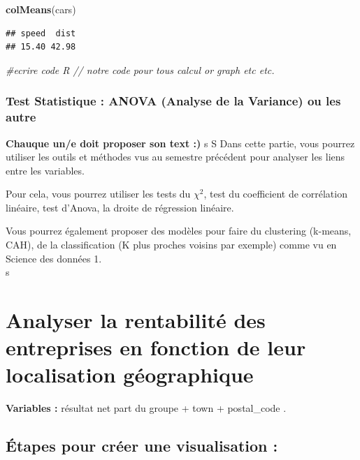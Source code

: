 \documentclass[mstat,12pt]{unswthesis}
\newenvironment{Shaded}{\begin{snugshade}}{\end{snugshade}}
\newcommand{\CommentTok}[1]{\textcolor[rgb]{0.56,0.35,0.01}{\textit{#1}}}
\newcommand{\FunctionTok}[1]{\textcolor[rgb]{0.13,0.29,0.53}{\textbf{#1}}}
\newcommand{\NormalTok}[1]{#1}
\begin{document}
\begin{Shaded}
\begin{Highlighting}[]
\FunctionTok{colMeans}\NormalTok{(cars)}
\end{Highlighting}
\end{Shaded}

\begin{verbatim}
## speed  dist 
## 15.40 42.98
\end{verbatim}

\begin{Shaded}
\begin{Highlighting}[]
 \CommentTok{\#ecrire code R // notre code pour tous calcul or graph etc etc. }
\end{Highlighting}
\end{Shaded}

\subsubsection{Test Statistique : ANOVA (Analyse de la Variance) ou les
autre}\label{test-statistique-anova-analyse-de-la-variance-ou-les-autre-1}

\textbf{Chauque un/e doit proposer son text :) }s S Dans cette partie,
vous pourrez utiliser les outils et méthodes vus au semestre précédent
pour analyser les liens entre les variables.

Pour cela, vous pourrez utiliser les tests du \(\chi^2\), test du
coefficient de corrélation linéaire, test d'Anova, la droite de
régression linéaire.

Vous pourrez également proposer des modèles pour faire du clustering
(k-means, CAH), de la classification (K plus proches voisins par
exemple) comme vu en Science des données 1.\\
s \newpage

\section{\texorpdfstring{\textbf{Analyser la rentabilité des entreprises
en fonction de leur localisation
géographique}}{Analyser la rentabilité des entreprises en fonction de leur localisation géographique}}\label{analyser-la-rentabilituxe9-des-entreprises-en-fonction-de-leur-localisation-guxe9ographique}

\bigskip

\textbf{Variables :} résultat net part du groupe + town + postal\_code .

\subsection{Étapes pour créer une visualisation
:}\label{uxe9tapes-pour-cruxe9er-une-visualisation-2}
\end{document}
